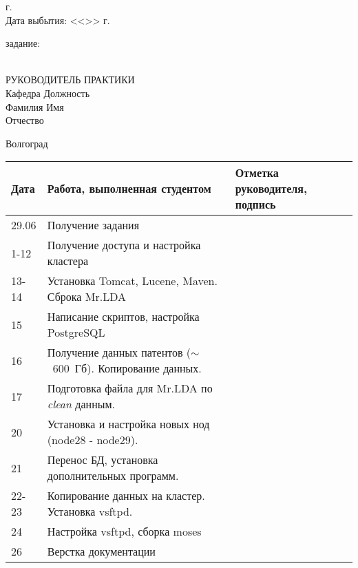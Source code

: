 \begin{titlepage}
\begin{flushleft}
        \the\year г.\\
        Дата выбытия: \hspace{3cm}<<\underline{\hspace{1cm}}>> \underline{\hspace{3cm}} 
        \the\year г.
    \end{flushleft}
    \vspace{0.5cm}
     задание: \underline{\hspace{11.25cm}}\\
    \underline{\hspace{\textwidth}}\\
    \vspace{0.5cm}
    \begin{flushleft}
        РУКОВОДИТЕЛЬ ПРАКТИКИ\\
        Кафедра \underline{\hspace{5.15cm}} Должность \underline{\hspace{5cm}} \\
        Фамилия \underline{\hspace{5cm}} Имя \underline{\hspace{6.5cm}}\\
        Отчество \underline{\hspace{5cm}}
    \end{flushleft}
    \vspace{\fill}
    \begin{center}
        Волгоград \the\year
    \end{center}
\end{titlepage}
\begin{table}[h!]
    \centering
    \begin{tabular}{|m{}|m{}|m{}|}
        \hline
        Дата & Работа, выполненная студентом & Отметка
        руководителя, подпись \\ \hline
        29.06 & Получение задания & \\ \hline
        1-12 & Получение доступа и настройка кластера & \\ \hline
        13-14 & Установка Tomcat, Lucene, Maven. Сброка Mr.LDA & \\ \hline
        15 & Написание скриптов, настройка PostgreSQL & \\ \hline
        16 & Получение данных патентов (\( \sim \)~600~Гб). Копирование данных. & \\ \hline
        17 & Подготовка файла для Mr.LDA по \emph{clean} данным. & \\ \hline
        20 & Установка и настройка новых нод (node28 - node29). & \\ \hline
        21 & Перенос БД, установка дополнительных программ. & \\ \hline
        22-23 & Копирование данных на кластер. Установка vsftpd. & \\ \hline
        24 & Настройка vsftpd, сборка moses & \\ \hline
        26 & Верстка документации & \\ \hline
    \end{tabular}
\end{table}
